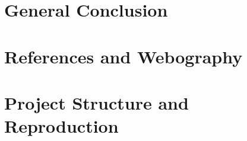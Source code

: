 ﻿\documentclass[12pt,a4paper,openright]{report}
\begin{document}
\chapter*{General Conclusion}

\chapter*{References and Webography}

\appendix
\chapter{Project Structure and Reproduction}

\end{document}
